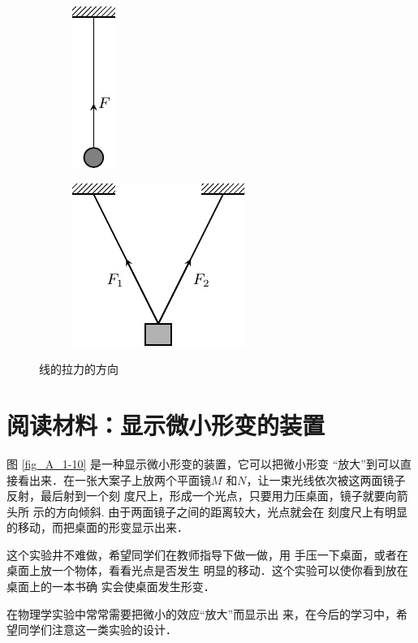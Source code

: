 \begin{figure} [htp]\centering
\begin{subfigure} {0.46\linewidth} 
	\centering
	\includegraphics{fig/A/1-9a.pdf} 
	\caption{} \label{fig_A_1-9a} 
\end{subfigure} 
\hfil
\begin{subfigure} {0.46\linewidth} 
	\centering
	\includegraphics{fig/A/1-9b.pdf} 
	\caption{} \label{fig_A_1-9b} 
\end{subfigure} 
\caption{线的拉力的方向} \label{fig_A_1-9} 
\end{figure} 

\section*{阅读材料：显示微小形变的装置} 


图 \ref{fig_A_1-10} 是一种显示微小形变的装置，它可以把微小形变
“放大”到可以直接看出来．在一张大案子上放两个平面镜$M$
和$N$，让一束光线依次被这两面镜子反射，最后射到一个刻
度尺上，形成一个光点，只要用力压桌面，镜子就要向箭头所
示的方向倾斜. 由于两面镜子之间的距离较大，光点就会在
刻度尺上有明显的移动，而把桌面的形变显示出来．

    这个实验井不难做，希望同学们在教师指导下做一做，用
手压一下桌面，或者在桌面上放一个物体，看看光点是否发生
明显的移动．这个实验可以使你看到放在桌面上的一本书确
实会使桌面发生形变．

    在物理学实验中常常需要把微小的效应“放大”而显示出
来，在今后的学习中，希望同学们注意这一类实验的设计．

